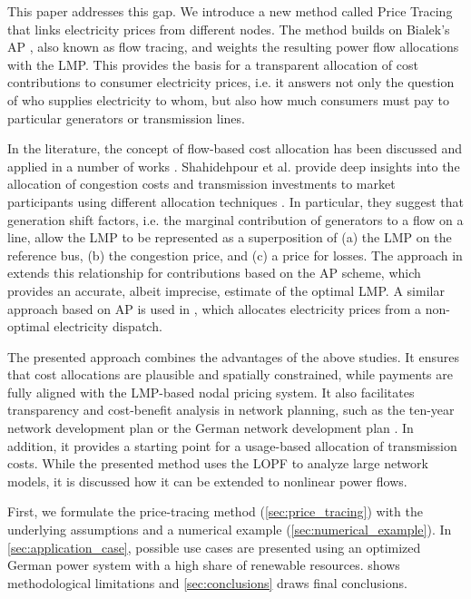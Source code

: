 \documentclass[11pt,twocolumn]{article}
\begin{document}
This paper addresses this gap. We introduce a new method called Price Tracing that links electricity prices from different nodes. The method builds on Bialek's \ac{AP} \cite{bialek_tracing_1996}, also known as flow tracing, and weights the resulting power flow allocations with the \ac{LMP}. This provides the basis for a transparent allocation of cost contributions to consumer electricity prices, i.e. it answers not only the question of who supplies electricity to whom, but also how much consumers must pay to particular generators or transmission lines. 

In the literature, the concept of flow-based cost allocation has been discussed and applied in a number of works \cite{galiana_transmission_2003,shahidehpour_market_2002,meng_investigation_2007,schafer_allocation_2017,nikoukar_transmission_2012,arabali_pricing_2012,wu_locational_2005}. Shahidehpour et al. provide deep insights into the allocation of congestion costs and transmission investments to market participants using different allocation techniques \cite{shahidehpour_market_2002}. In particular, they suggest that generation shift factors, i.e. the marginal contribution of generators to a flow on a line, allow the \ac{LMP} to be represented as a superposition of (a) the \ac{LMP} on the reference bus, (b) the congestion price, and (c) a price for losses. The approach in \cite{meng_investigation_2007} extends this relationship for contributions based on the \ac{AP} scheme, which provides an accurate, albeit imprecise, estimate of the optimal \ac{LMP}. A similar approach based on \ac{AP} is used in \cite{schafer_allocation_2017}, which allocates electricity prices from a non-optimal electricity dispatch.

The presented approach combines the advantages of the above studies. It ensures that cost allocations are plausible and spatially constrained, while payments are fully aligned with the \ac{LMP}-based nodal pricing system. It also facilitates transparency and cost-benefit analysis in network planning, such as the ten-year network development plan \cite{entso-e_completing_2020} or the German network development plan \cite{bundesnetzagentur_netzentwicklungsplan_2020}. In addition, it provides a starting point for a usage-based allocation of transmission costs. While the presented method uses the \ac{LOPF} to analyze large network models, it is discussed how it can be extended to nonlinear power flows. 

First, we formulate the price-tracing method (\cref{sec:price_tracing}) with the underlying assumptions and a numerical example (\cref{sec:numerical_example}). In \cref{sec:application_case}, possible use cases are presented using an optimized German power system with a high share of renewable resources.  shows methodological limitations and \cref{sec:conclusions} draws final conclusions. 
\end{document}
